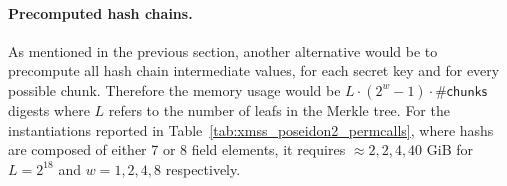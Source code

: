 \newpage

\paragraph{Precomputed hash chains.}
As mentioned in the previous section, another alternative would be to precompute all hash chain intermediate values, for each secret key and for every possible chunk.
Therefore the memory usage would be $L \cdot (2^w-1) \cdot \#\mathsf{chunks}$ digests where $L$ refers to the number of leafs in the Merkle tree.
For the instantiations reported in Table~\ref{tab:xmss_poseidon2_permcalls}, where hashs are composed of either 7 or 8 field elements, it requires $\approx 2, 2, 4, 40$ GiB for $L= 2^{18}$ and $w = 1, 2, 4, 8$ respectively.



